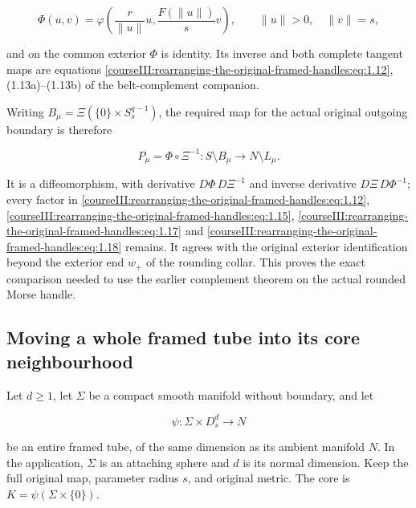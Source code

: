 \begin{equation}
\Phi(u,v)=
\varphi\left(\frac r{\|u\|}u,\frac{F(\|u\|)}s v\right),
\qquad \|u\|>0,\quad \|v\|=s,
\label{courseIII:rearranging-the-original-framed-handles:eq:1.18}
\end{equation}

and on the common exterior \(\Phi\) is identity. Its inverse and both complete tangent maps are equations \eqref{courseIII:rearranging-the-original-framed-handles:eq:1.12}, (1.13a)--(1.13b) of the belt-complement companion.

Writing \(B_\mu=\Xi(\{0\}\times S_s^{q-1})\), the required map for the actual original outgoing boundary is therefore

\begin{equation}
P_\mu=\Phi\circ\Xi^{-1}:
S\setminus B_\mu\longrightarrow N\setminus L_\mu.
\label{courseIII:rearranging-the-original-framed-handles:eq:1.19}
\end{equation}

It is a diffeomorphism, with derivative \(D\Phi\,D\Xi^{-1}\) and inverse derivative \(D\Xi\,D\Phi^{-1}\); every factor in \eqref{courseIII:rearranging-the-original-framed-handles:eq:1.12}, \eqref{courseIII:rearranging-the-original-framed-handles:eq:1.15}, \eqref{courseIII:rearranging-the-original-framed-handles:eq:1.17} and \eqref{courseIII:rearranging-the-original-framed-handles:eq:1.18} remains. It agrees with the original exterior identification beyond the exterior end \(w_+\) of the rounding collar. This proves the exact comparison needed to use the earlier complement theorem on the actual rounded Morse handle.

\subsection{Moving a whole framed tube into its core neighbourhood}
\label{courseIII:rearranging-the-original-framed-handles:arrangement-tube-compression}

\label{courseIII:rearranging-the-original-framed-handles:section-2}\label{courseIII:handle-arrangement:2}

Let \(d\geq1\), let \(\Sigma\) be a compact smooth manifold without boundary, and let

\begin{equation}
\psi:\Sigma\times D_s^d\longrightarrow N
\label{courseIII:rearranging-the-original-framed-handles:eq:2.1}
\end{equation}

be an entire framed tube, of the same dimension as its ambient manifold \(N\). In the application, \(\Sigma\) is an attaching sphere and \(d\) is its normal dimension. Keep the full original map, parameter radius \(s\), and original metric. The core is \(K=\psi(\Sigma\times\{0\})\).

